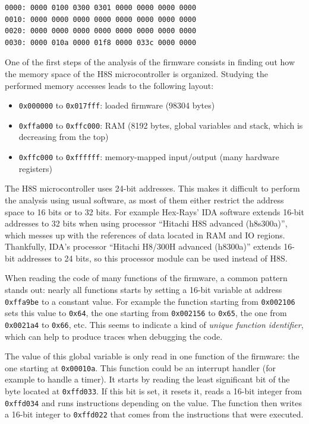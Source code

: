 \begin{lstlisting}[language={},caption={Hexadecimal dump of \texttt{bridge7758.mot}'s header.},label={lst:idrackar:bridge7758-header-hex}]
0000: 0000 0100 0300 0301 0000 0000 0000 0000
0010: 0000 0000 0000 0000 0000 0000 0000 0000
0020: 0000 0000 0000 0000 0000 0000 0000 0000
0030: 0000 010a 0000 01f8 0000 033c 0000 0000
\end{lstlisting}

One of the first steps of the analysis of the firmware consists in finding out how the memory space of the H8S microcontroller is organized.
Studying the performed memory accesses leads to the following layout:
\begin{itemize}
  \item \texttt{0x000000} to \texttt{0x017fff}: loaded firmware (98304 bytes)
  \item \texttt{0xffa000} to \texttt{0xffc000}: RAM (8192 bytes, global variables and stack, which is decreasing from the top)
  \item \texttt{0xffc000} to \texttt{0xffffff}: memory-mapped input/output (many hardware registers)
\end{itemize}

The H8S microcontroller uses 24-bit addresses.
This makes it difficult to perform the analysis using usual software, as most of them either restrict the address space to 16 bits or to 32 bits.
For example Hex-Rays' IDA software extends 16-bit addresses to 32 bits when using processor ``Hitachi H8S advanced (h8s300a)'', which messes up with the references of data located in RAM and IO regions.
Thankfully, IDA's processor ``Hitachi H8/300H advanced (h8300a)'' extends 16-bit addresses to 24 bits, so this processor module can be used instead of H8S.

When reading the code of many functions of the firmware, a common pattern stands out: nearly all functions starts by setting a 16-bit variable at address \texttt{0xffa9be} to a constant value.
For example the function starting from \texttt{0x002106} sets this value to \texttt{0x64}, the one starting from \texttt{0x002156} to \texttt{0x65}, the one from \texttt{0x0021a4} to \texttt{0x66}, etc.
This seems to indicate a kind of \emph{unique function identifier}, which can help to produce traces when debugging the code.

The value of this global variable is only read in one function of the firmware: the one starting at \texttt{0x00010a}.
This function could be an interrupt handler (for example to handle a timer).
It starts by reading the least significant bit of the byte located at \texttt{0xffd033}.
If this bit is set, it resets it, reads a 16-bit integer from \texttt{0xffd034} and runs instructions depending on the value.
The function then writes a 16-bit integer to \texttt{0xffd022} that comes from the instructions that were executed.

